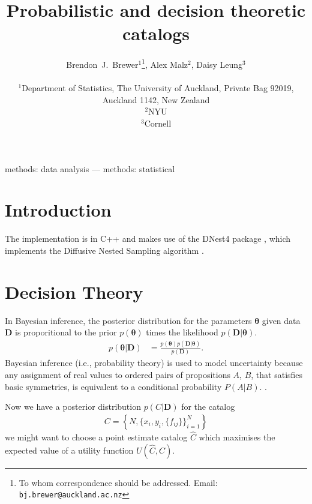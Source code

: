 \documentclass[a4paper,fleqn,usenatbib]{mnras}
\title[]
{Probabilistic and decision theoretic catalogs}
\author[Brewer, Malz, and Leung]{%
  Brendon~J.~Brewer$^{1}$\thanks{To whom correspondence should be addressed. Email: {\tt bj.brewer@auckland.ac.nz}}, Alex Malz$^2$, Daisy Leung$^3$\\
  \medskip\\
  $^1$Department of Statistics, The University of Auckland, Private Bag 92019,
        Auckland 1142, New Zealand\\
  $^2$NYU\\
  $^3$Cornell}
\date{}
\newcommand{\params}{\boldsymbol{\theta}}
\newcommand{\data}{\boldsymbol{D}}
\begin{document}
\label{firstpage}
\pagerange{\pageref{firstpage}--\pageref{lastpage}}
\maketitle

\begin{abstract}
\end{abstract}

\begin{keywords}
methods: data analysis --- methods: statistical
\end{keywords}



\section{Introduction}


The implementation is in C++ and makes use of the DNest4 package \citep{dnest4},
which implements the Diffusive Nested Sampling algorithm \citep{dns}.

\section{Decision Theory}
In Bayesian inference, the posterior distribution for the parameters
$\params$ given data $\data$ is proporitional to the prior $p(\params)$
times the likelihood $p(\data | \params)$.
\begin{align}
p(\params | \data) &= \frac{p(\params)p(\data | \params)}{p(\data)}.
\end{align}
Bayesian inference (i.e., probability theory) is used to model uncertainty
because any assignment of real values to
ordered pairs of propositions $A$, $B$, that satisfies basic
symmetries, is equivalent to a conditional probability $P(A | B)$.
\citep{knuth2012foundations}.


Now we have a posterior distribution $p(C|\data)$ for the catalog
\begin{eqnarray}
C = \left\{N,\{x_i, y_i, \{f_{ij}\}\}_{i=1}^N \right\}
\end{eqnarray}
we might want to choose a point estimate catalog $\hat{C}$ which
maximises the expected value of a utility function $U(\hat{C}, C)$.\\
\end{document}
